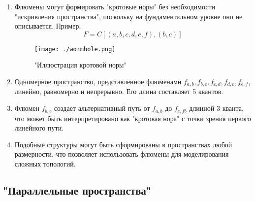 \documentclass[final]{article}
\begin{document}
            \begin{enumerate}

                \item Флюмены могут формировать "кротовые норы" без необходимости 
                "искривления пространства", поскольку на фундаментальном уровне оно 
                не описывается. Пример: \[ F = C[(a,b,c,d,e,f),(b,c)] 
                \]

                \begin{figure}[H]
                    \centering
                    \texttt{[image: ./wormhole.png]}
                    \caption{"Иллюстрация кротовой норы"}
                    \label{fig:image}
                \end{figure}

                \item Одномерное пространство, представленное флюменами \(f_{a,b}, 
                f_{b,c}, f_{c,d}, f_{d,e}, f_{e,f}\), линейно, равномерно и 
                непрерывно. Его длина составляет 5 квантов.

                \item Флюмен \( f_{b,c} \) создает альтернативный путь от 
                \(f_{a,b}\) до \(f_{e,fb}\) длинной 3 кванта, что может быть 
                интерпретировано как "кротовая нора" с точки зрения первого 
                линейного пути.

                \item Подобные структуры могут быть сформированы в пространствах любой 
                размерности, что позволяет использовать флюмены для моделирования сложных 
                топологий.

            \end{enumerate}



        \subsection{"Параллельные пространства"}
\end{document}
